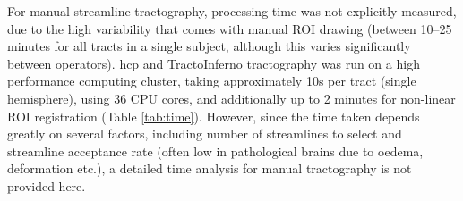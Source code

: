 For manual streamline tractography, processing time was not explicitly measured, due to the high variability that comes with manual ROI drawing (between 10--25 minutes for all tracts in a single subject, although this varies significantly between operators).
\Gls{hcp} and TractoInferno tractography was run on a high performance computing cluster, taking approximately 10s per tract (single hemisphere), using 36 CPU cores, and additionally up to 2 minutes for non-linear ROI registration (Table \ref{tab:time}).
However, since the time taken depends greatly on several factors, including number of streamlines to select and streamline acceptance rate (often low in pathological brains due to oedema, deformation etc.), a detailed time analysis for manual tractography is not provided here.

